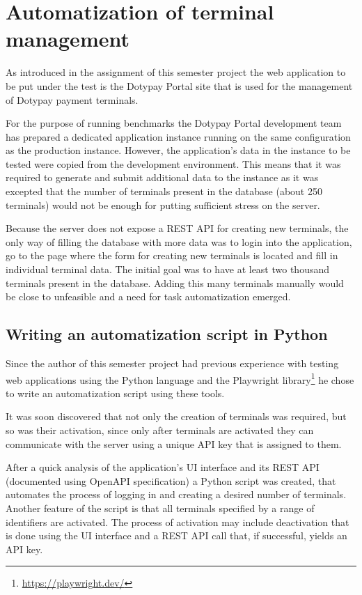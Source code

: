 \documentclass[12pt, a4paper]{article}
\let\oldsection\section
\renewcommand\section{\clearpage\oldsection}
\begin{document}
\section{Automatization of terminal management}

As introduced in the assignment of this semester project the web application to be put under the test is the Dotypay Portal site that is used for the management of Dotypay payment terminals.

For the purpose of running benchmarks the Dotypay Portal development team has prepared a dedicated application instance running on the same configuration as the production instance.
However, the application's data in the instance to be tested were copied from the development environment.
This means that it was required to generate and submit additional data to the instance as it was excepted that the number of terminals present in the database (about 250 terminals)  would not be enough for putting sufficient stress on the server.

Because the server does not expose a REST API for creating new terminals, the only way of filling the database with more data was to login into the application, go to the page where the form for creating new terminals is located and fill in individual terminal data. 
The initial goal was to have at least two thousand terminals present in the database.
Adding this many terminals manually would be close to unfeasible and a need for task automatization emerged.


\subsection{Writing an automatization script in Python}

Since the author of this semester project had previous experience with testing web applications using the Python language and the Playwright library\footnote{\url{https://playwright.dev/}} he chose to write an automatization script using these tools.

It was soon discovered that not only the creation of terminals was required, but so was their activation, since only after terminals are activated they can communicate with the server using a unique API key that is assigned to them.

After a quick analysis of the application's UI interface and its REST API (documented using OpenAPI specification) a Python script was created, that automates the process of logging in and creating a desired number of terminals.
Another feature of the script is that all terminals specified by a range of identifiers are activated.
The process of activation may include deactivation that is done using the UI interface and a REST API call that, if successful, yields an API key.
\end{document}
